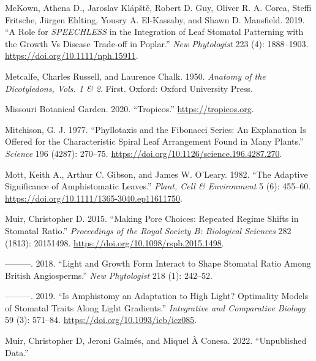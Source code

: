 \documentclass[
  12pt,
]{article}
\newlength{\cslhangindent}
\newlength{\cslentryspacingunit} %
\newenvironment{CSLReferences}[2] %
 {%
  \setlength{\parindent}{0pt}
  \ifodd #1
  \let\oldpar\par
  \def\par{\hangindent=\cslhangindent\oldpar}
  \fi
  \setlength{\parskip}{#2\cslentryspacingunit}
 }%
 {}
\begin{document}
\begin{CSLReferences}{1}{0}
\leavevmode{}%
McKown, Athena D., Jaroslav Klápště, Robert D. Guy, Oliver R. A. Corea, Steffi Fritsche, Jürgen Ehlting, Yousry A. El‐Kassaby, and Shawn D. Mansfield. 2019. {``A Role for \emph{SPEECHLESS} in the Integration of Leaf Stomatal Patterning with the Growth Vs Disease Trade‐off in Poplar.''} \emph{New Phytologist} 223 (4): 1888--1903. \url{https://doi.org/10.1111/nph.15911}.

\leavevmode{}%
Metcalfe, Charles Russell, and Laurence Chalk. 1950. \emph{Anatomy of the Dicotyledons, {Vols}. 1 \& 2}. First. Oxford: Oxford University Press.

\leavevmode{}%
Missouri Botanical Garden. 2020. {``Tropicos.''} \url{https://tropicos.org}.

\leavevmode{}%
Mitchison, G. J. 1977. {``Phyllotaxis and the {Fibonacci} {Series}: {An} Explanation Is Offered for the Characteristic Spiral Leaf Arrangement Found in Many Plants.''} \emph{Science} 196 (4287): 270--75. \url{https://doi.org/10.1126/science.196.4287.270}.

\leavevmode{}%
Mott, Keith A., Arthur C. Gibson, and James W. O'Leary. 1982. {``The Adaptive Significance of Amphistomatic Leaves.''} \emph{Plant, Cell \& Environment} 5 (6): 455--60. \url{https://doi.org/10.1111/1365-3040.ep11611750}.

\leavevmode{}%
Muir, Christopher D. 2015. {``Making Pore Choices: Repeated Regime Shifts in Stomatal Ratio.''} \emph{Proceedings of the Royal Society B: Biological Sciences} 282 (1813): 20151498. \url{https://doi.org/10.1098/rspb.2015.1498}.

\leavevmode{}%
---------. 2018. {``Light and Growth Form Interact to Shape Stomatal Ratio Among {British} Angiosperms.''} \emph{New Phytologist} 218 (1): 242--52.

\leavevmode{}%
---------. 2019. {``Is {Amphistomy} an {Adaptation} to {High} {Light}? {Optimality} {Models} of {Stomatal} {Traits} Along {Light} {Gradients}.''} \emph{Integrative and Comparative Biology} 59 (3): 571--84. \url{https://doi.org/10.1093/icb/icz085}.

\leavevmode{}%
Muir, Christopher D, Jeroni Galmés, and Miquel À Conesa. 2022. {``Unpublished Data.''}


\end{CSLReferences}
\end{document}
